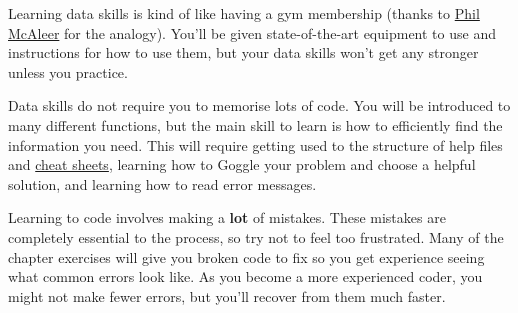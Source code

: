 \documentclass[
]{book}
\begin{document}
Learning data skills is kind of like having a gym membership (thanks to \href{https://twitter.com/McAleerP}{Phil McAleer} for the analogy). You'll be given state-of-the-art equipment to use and instructions for how to use them, but your data skills won't get any stronger unless you practice.

Data skills do not require you to memorise lots of code. You will be introduced to many different functions, but the main skill to learn is how to efficiently find the information you need. This will require getting used to the structure of help files and \href{https://www.rstudio.com/resources/cheatsheets/}{cheat sheets}, learning how to Goggle your problem and choose a helpful solution, and learning how to read error messages.

Learning to code involves making a \textbf{lot} of mistakes. These mistakes are completely essential to the process, so try not to feel too frustrated. Many of the chapter exercises will give you broken code to fix so you get experience seeing what common errors look like. As you become a more experienced coder, you might not make fewer errors, but you'll recover from them much faster.

  
\end{document}
